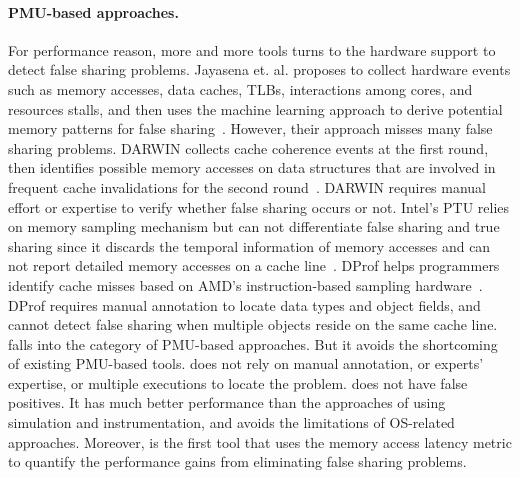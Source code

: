 \paragraph{PMU-based approaches.} For performance reason, more and more tools turns to the hardware support to detect false sharing problems. Jayasena et. al. proposes to collect hardware events such as memory accesses, data caches, TLBs, interactions among cores, and resources stalls, and then uses the machine learning approach to derive potential memory patterns for false sharing~\cite{mldetect}. However, their approach misses many false sharing problems. DARWIN collects cache coherence events at the first round, then identifies possible memory accesses on data structures that are involved in frequent cache invalidations for the second round~\cite{openmp}. DARWIN requires manual effort or expertise to verify whether false sharing occurs or not. Intel's PTU relies on memory sampling mechanism but can not differentiate false sharing and true sharing since it discards the temporal information of memory accesses and can not report detailed memory accesses on a cache line~\cite{detect:ptu}. DProf helps programmers identify cache misses based on AMD's instruction-based sampling hardware~\cite{DProf}. DProf requires manual annotation to locate data types and object fields, and cannot detect false sharing when multiple objects reside on the same cache line. \\

\cheetah{} falls into the category of PMU-based approaches. But it avoids the shortcoming of existing PMU-based tools. \cheetah{} does not rely on manual annotation, or experts' expertise, or multiple executions to locate the problem. \Cheetah{} does not have false positives. It has much better performance than the approaches of using simulation and instrumentation, and avoids the limitations of OS-related approaches. Moreover, \cheetah{} is the first tool that uses the memory access latency metric to quantify the performance gains from eliminating false sharing problems.



